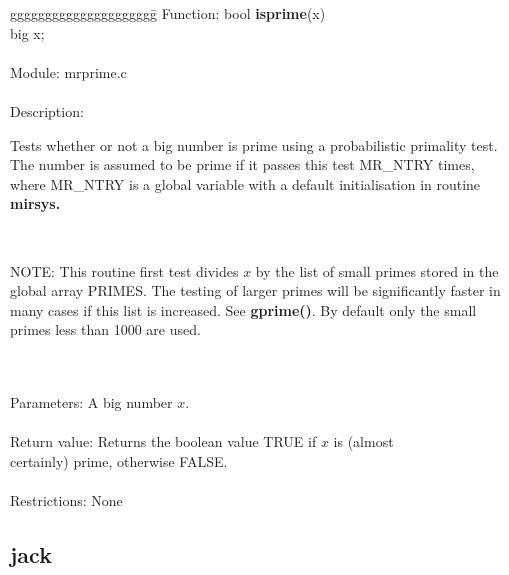\begin{tabbing}
ggggggggggggggggggggg\= \kill
      Function:      \>bool {\bf isprime}(x) \\
                     \>big x; \\
      \ \\
      Module:        \>mrprime.c \\
      \ \\
      Description:   \>
                     \parbox[t]{3in}
                     {Tests whether or not a big number is prime using a
                     probabilistic primality test. The number is assumed
                     to be prime if it passes this test MR\_NTRY times, where
                     MR\_NTRY is a global variable with a default initialisation
                     in routine {\bf mirsys.}} \\
                     \>
                     \parbox[t]{3in}
                     {NOTE: This routine first test divides $x$ by the list of
                     small primes stored in the global array PRIMES. The
                     testing of larger primes will be significantly faster
                     in many cases if this list is increased. See {\bf gprime()}. 
                     By default only the small primes less than 1000 are
                     used.} \\
      \ \\
      Parameters:    \>A big number $x$. \\
      \ \\
      Return value:  \>Returns the boolean value TRUE if $x$ is (almost \\
                     \>certainly) prime, otherwise FALSE. \\
      \ \\
      Restrictions:  \>None

\end{tabbing}


\subsection{jack}

